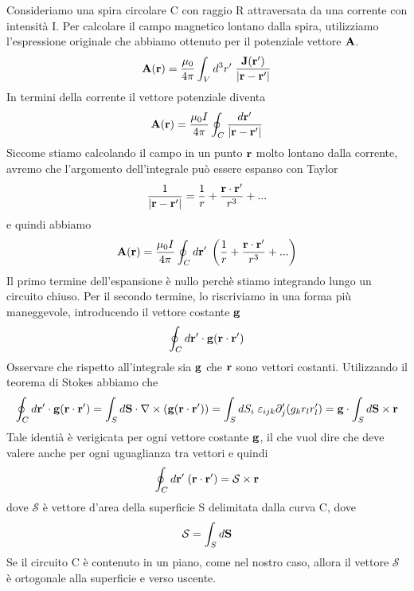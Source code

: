 Consideriamo una spira circolare C con raggio R attraversata da una corrente con intensit\`a I. Per calcolare il campo magnetico lontano dalla spira, utilizziamo l'espressione originale che abbiamo ottenuto per il potenziale vettore $\bold{A}$.
\begin{equation*}
	\bold{A}(\bold{r}) = \frac{\mu_0}{4 \pi} \int_{V} d^3r' \; \frac{\bold{J}(\bold{r}')}{|\bold{r}-\bold{r}'|}
\end{equation*}
In termini della corrente il vettore potenziale diventa
\begin{equation*}
	\bold{A}(\bold{r}) = \frac{\mu_0 I}{4 \pi} \oint_{C} \frac{d\bold{r}'}{|\bold{r}-\bold{r}'|}
\end{equation*}
Siccome stiamo calcolando il campo in un punto $\bold{r}$ molto lontano dalla corrente, avremo che l'argomento dell'integrale pu\`o essere espanso con Taylor 
\begin{equation*}
	\frac{1}{|\bold{r} - \bold{r}'|} = \frac{1}{r} + \frac{\bold{r} \cdot \bold{r}'}{r^3}+...
\end{equation*}
e quindi abbiamo
\begin{equation*}
	\bold{A}(\bold{r}) = \frac{\mu_0 I}{4 \pi} \oint_{C} d\bold{r}' \; \left ( \frac{1}{r} + \frac{\bold{r} \cdot \bold{r}'}{r^3}+...\right)
\end{equation*}
Il primo termine dell'espansione \`e nullo perch\`e stiamo integrando lungo un circuito chiuso. Per il secondo termine, lo riscriviamo in una forma pi\`u maneggevole, introducendo il vettore costante $\bold{g}$
\begin{equation*}
	\oint_{C}d\bold{r}' \cdot \bold{g}(\bold{r} \cdot \bold{r}')
\end{equation*}
Osservare che rispetto all'integrale sia $\bold{g}$ che $\bold{r}$ sono vettori costanti. Utilizzando il teorema di Stokes  abbiamo che 
\begin{equation*}
	\oint_{C}d\bold{r}' \cdot \bold{g}(\bold{r} \cdot \bold{r}') = \int_{S} d\bold{S} \cdot \nabla \times (\bold{g}(\bold{r}\cdot \bold{r}')) = \int_{S} dS_i \; \varepsilon_{ijk}\partial_j'(g_kr_lr_l') = \bold{g} \cdot \int_{S} d\bold{S} \times \bold{r}
\end{equation*}
Tale identi\`a \`e verigicata per ogni vettore costante $\bold{g}$, il che vuol dire che deve valere anche per ogni uguaglianza tra vettori e quindi
\begin{equation*}
	\oint_{C}d\bold{r}' \; (\bold{r} \cdot \bold{r}') = \mathcal{S} \times \bold{r}
\end{equation*}
dove $\mathcal{S}$ \`e vettore d'area della superficie S delimitata dalla curva C, dove 
\begin{equation*}
	\mathcal{S} = \int_{S}d\bold{S}
\end{equation*}
Se il circuito C \`e contenuto in un piano, come nel nostro caso, allora il vettore $\mathcal{S}$ \`e ortogonale alla superficie e verso uscente.

